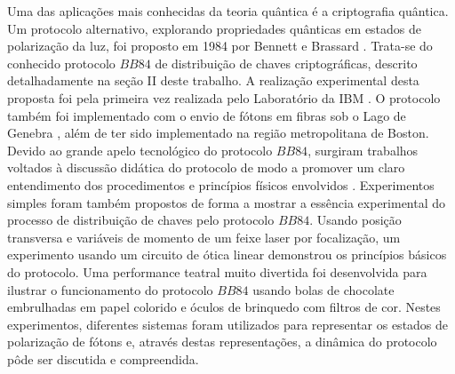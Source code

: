 \documentclass[pra, twocolumn]{revtex4}
\begin{document}
Uma das aplica\c{c}\~oes mais conhecidas da teoria qu\^antica  \'e a criptografia qu\^antica. Um protocolo alternativo, explorando propriedades qu\^anticas em estados de polariza\c{c}\~ao da luz, foi proposto em 1984 por Bennett e Brassard \cite{bb841}. Trata-se do conhecido protocolo $BB84$ de distribui\c{c}\~ao de chaves criptogr\'aficas, descrito detalhadamente na se\c{c}\~ao II deste trabalho. A realiza\c{c}\~ao experimental desta proposta foi pela primeira vez realizada pelo Laborat\'orio da IBM \cite{ibm}. O protocolo tamb\'em foi implementado com o envio de f\'otons em fibras sob o Lago de Genebra \cite{geneva}, al\'em de ter sido implementado na regi\~ao metropolitana de Boston\cite{darpa}.
%
Devido ao grande apelo tecnol\'ogico do protocolo $BB84$, surgiram trabalhos voltados \`a discuss\~ao did\'atica do protocolo de modo a promover um claro entendimento dos procedimentos e princ\'ipios f\'isicos envolvidos \cite{bb84RBEF}. Experimentos simples foram tamb\'em propostos de forma a mostrar a ess\^encia experimental do processo de distribui\c{c}\~ao de chaves pelo protocolo $BB84$. Usando posi\c{c}\~ao transversa e vari\'aveis de momento de um feixe laser por focaliza\c{c}\~ao, um experimento usando um circuito de \'otica linear demonstrou os princ\'ipios b\'asicos do protocolo\cite{lemelle}. Uma performance teatral muito divertida foi desenvolvida para ilustrar o funcionamento do protocolo $BB84$ usando bolas de chocolate embrulhadas em papel colorido e \'oculos de brinquedo com filtros de cor\cite{svozil}. Nestes experimentos, diferentes sistemas foram utilizados para representar os estados de polariza\c{c}\~ao de f\'otons e, atrav\'es destas representa\c{c}\~oes, a din\^amica do protocolo p\^ode ser discutida e compreendida.
\end{document}
